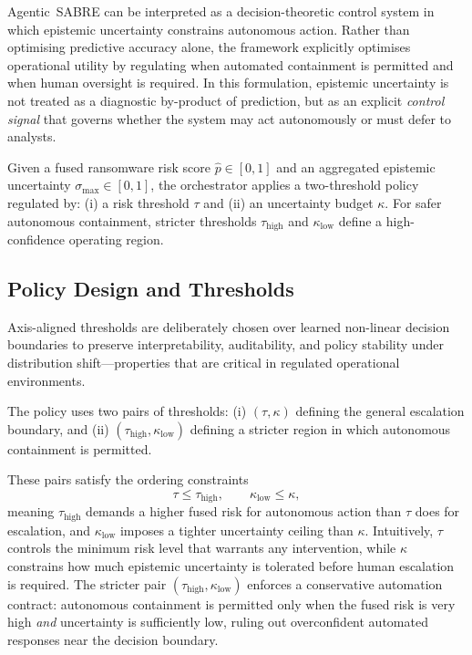 \documentclass[3p]{elsarticle}
\begin{document}
Agentic~SABRE can be interpreted as a decision-theoretic control system in which
epistemic uncertainty constrains autonomous action. Rather than optimising
predictive accuracy alone, the framework explicitly optimises operational utility
by regulating when automated containment is permitted and when human oversight
is required. In this formulation, epistemic uncertainty is not treated as a
diagnostic by-product of prediction, but as an explicit \emph{control signal}
that governs whether the system may act autonomously or must defer to analysts.

Given a fused ransomware risk score $\hat{p} \in [0,1]$ and an aggregated epistemic
uncertainty $\sigma_{\max} \in [0,1]$, the orchestrator applies a two-threshold
policy regulated by: (i) a risk threshold $\tau$ and (ii) an uncertainty budget
$\kappa$. For safer autonomous containment, stricter thresholds
$\tau_{\text{high}}$ and $\kappa_{\text{low}}$ define a high-confidence operating
region.


\subsection{Policy Design and Thresholds}
\label{subsec:policy_thresholds}
Axis-aligned thresholds are deliberately chosen over learned non-linear decision boundaries to preserve interpretability, auditability, and policy stability under distribution shift—properties that are critical in regulated operational environments.

The policy uses two pairs of thresholds:
(i) $(\tau,\kappa)$ defining the general escalation boundary, and
(ii) $(\tau_{\text{high}},\kappa_{\text{low}})$ defining a stricter region in which
autonomous containment is permitted.
\begin{changedblock}
These pairs satisfy the ordering constraints
\begin{equation}
\tau \le \tau_{\text{high}}, \qquad \kappa_{\text{low}} \le \kappa,
\label{eq:threshold_order}
\end{equation}
meaning $\tau_{\text{high}}$ demands a higher fused risk for autonomous action than $\tau$
does for escalation, and $\kappa_{\text{low}}$ imposes a tighter uncertainty ceiling than
$\kappa$. Intuitively, $\tau$ controls the minimum risk level that warrants any intervention,
while $\kappa$ constrains how much epistemic uncertainty is tolerated before human escalation
is required. The stricter pair $(\tau_{\text{high}},\kappa_{\text{low}})$ enforces a
conservative automation contract: autonomous containment is permitted only when the fused
risk is very high \emph{and} uncertainty is sufficiently low, ruling out overconfident
automated responses near the decision boundary.
\end{changedblock}
\end{document}
